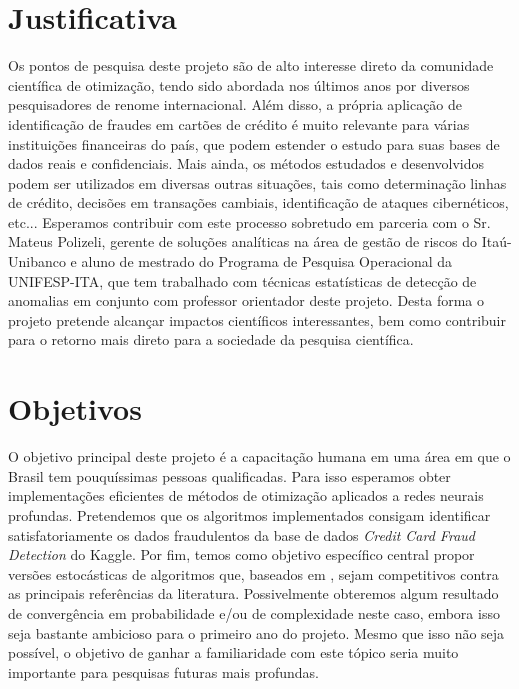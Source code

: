 \documentclass[a4paper,12pt]{article}
\begin{document}
\section{Justificativa}
Os pontos de pesquisa deste projeto são de alto interesse direto da comunidade científica de otimização, tendo sido abordada  nos últimos anos por diversos pesquisadores de renome internacional.  Além disso, a própria aplicação de identificação de fraudes em cartões de crédito é muito relevante para várias instituições financeiras do país,  que podem estender o estudo para suas bases de dados reais e confidenciais. Mais ainda, os métodos estudados e desenvolvidos podem ser utilizados em diversas outras situações, tais como determinação linhas de crédito, decisões em transações cambiais, identificação de ataques cibernéticos, etc...  Esperamos contribuir com este processo sobretudo em parceria com o Sr. Mateus Polizeli, gerente de soluções analíticas na área de gestão de riscos do Itaú-Unibanco e aluno de mestrado do Programa de Pesquisa Operacional da UNIFESP-ITA, que tem trabalhado com técnicas estatísticas de detecção de anomalias em conjunto com professor orientador deste projeto. Desta forma o projeto pretende alcançar impactos científicos interessantes, bem como contribuir para o retorno mais direto para a sociedade da pesquisa científica. %



\section{Objetivos}
O objetivo principal deste projeto é a capacitação humana em uma área em que o Brasil tem pouquíssimas pessoas qualificadas. Para isso esperamos obter implementações eficientes de métodos de otimização aplicados a redes neurais profundas. Pretendemos que os algoritmos implementados consigam identificar satisfatoriamente os dados fraudulentos da base de dados \textit{Credit Card Fraud Detection} do  Kaggle. Por fim, temos como objetivo específico central propor versões estocásticas de algoritmos que, baseados em \cite{bmLS}, sejam competitivos contra as principais referências da literatura. Possivelmente obteremos algum resultado de convergência em probabilidade e/ou de complexidade neste caso, embora isso seja bastante ambicioso para o primeiro ano do projeto. Mesmo que isso não seja possível, o objetivo de ganhar a familiaridade com este tópico seria muito importante para pesquisas futuras mais profundas. 
\end{document}
